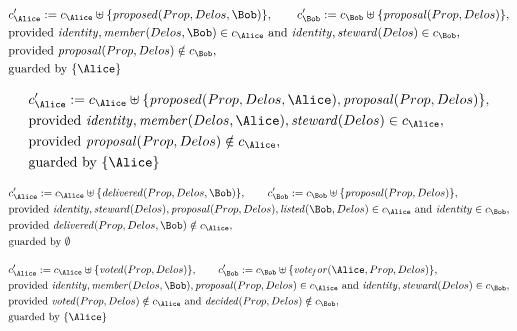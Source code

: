 \begin{align*}
&
c'_
{
\Alice
}
 := 
c_
{
\Alice
}
 \uplus 
\{
\mathit{
proposed
}
(
Prop
,
Delos
,
\Bob
)
\}
, \qquad 
c'_
{
\Bob
}
 := 
c_
{
\Bob
}
 \uplus 
\{
\mathit{
proposal
}
(
Prop
,
Delos
)
\}
,\\
&
\text{provided } 
\mathit{
identity
}
,
\mathit{
member
}
(
Delos
,
\Bob
)
 \in c_
{
\Alice
}
 \text{ and } 
\mathit{
identity
}
,
\mathit{
steward
}
(
Delos
)
 \in c_
{
\Bob
}
,\\
&
\text{provided } 
\mathit{
proposal
}
(
Prop
,
Delos
)
 \notin c_
{
\Bob
}
,\\
&
\text{guarded by } \{
\Alice
\}
\end{align*}

\begin{align*}
&
c'_
{
\Alice
}
 := 
c_
{
\Alice
}
 \uplus 
\{
\mathit{
proposed
}
(
Prop
,
Delos
,
\Alice
)
,
\mathit{
proposal
}
(
Prop
,
Delos
)
\}
,\\
&
\text{provided } 
\mathit{
identity
}
,
\mathit{
member
}
(
Delos
,
\Alice
)
,
\mathit{
steward
}
(
Delos
)
 \in c_
{
\Alice
}
,\\
&
\text{provided } 
\mathit{
proposal
}
(
Prop
,
Delos
)
 \notin c_
{
\Alice
}
,\\
&
\text{guarded by } \{
\Alice
\}
\end{align*}

\begin{align*}
&
c'_
{
\Alice
}
 := 
c_
{
\Alice
}
 \uplus 
\{
\mathit{
delivered
}
(
Prop
,
Delos
,
\Bob
)
\}
, \qquad 
c'_
{
\Bob
}
 := 
c_
{
\Bob
}
 \uplus 
\{
\mathit{
proposal
}
(
Prop
,
Delos
)
\}
,\\
&
\text{provided } 
\mathit{
identity
}
,
\mathit{
steward
}
(
Delos
)
,
\mathit{
proposal
}
(
Prop
,
Delos
)
,
\mathit{
listed
}
(
\Bob
,
Delos
)
 \in c_
{
\Alice
}
 \text{ and } 
\mathit{
identity
}
 \in c_
{
\Bob
}
,\\
&
\text{provided } 
\mathit{
delivered
}
(
Prop
,
Delos
,
\Bob
)
 \notin c_
{
\Alice
}
,\\
&
\text{guarded by } \emptyset
\end{align*}

\begin{align*}
&
c'_
{
\Alice
}
 := 
c_
{
\Alice
}
 \uplus 
\{
\mathit{
voted
}
(
Prop
,
Delos
)
\}
, \qquad 
c'_
{
\Bob
}
 := 
c_
{
\Bob
}
 \uplus 
\{
\mathit{
vote_for
}
(
\Alice
,
Prop
,
Delos
)
\}
,\\
&
\text{provided } 
\mathit{
identity
}
,
\mathit{
member
}
(
Delos
,
\Bob
)
,
\mathit{
proposal
}
(
Prop
,
Delos
)
 \in c_
{
\Alice
}
 \text{ and } 
\mathit{
identity
}
,
\mathit{
steward
}
(
Delos
)
 \in c_
{
\Bob
}
,\\
&
\text{provided } 
\mathit{
voted
}
(
Prop
,
Delos
)
 \notin c_
{
\Alice
}
 \text{ and } 
\mathit{
decided
}
(
Prop
,
Delos
)
 \notin c_
{
\Bob
}
,\\
&
\text{guarded by } \{
\Alice
\}
\end{align*}
